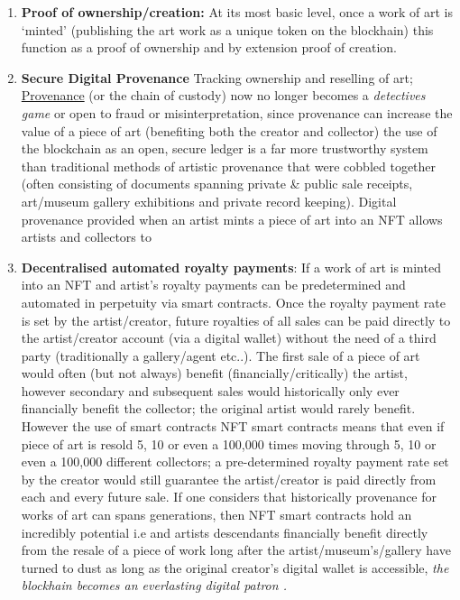 \begin{enumerate}
\def\labelenumi{\alph{enumi}.}
\item
  \textbf{Proof of ownership/creation:} At its most basic level, once a
  work of art is `minted' (publishing the art work as a unique token on
  the blockhain) this function as a proof of ownership and by extension
  proof of creation.
\item
  \textbf{Secure Digital Provenance} Tracking ownership and reselling of
  art; \href{https://en.wikipedia.org/wiki/Provenance}{Provenance} (or
  the chain of custody) now no longer becomes a \emph{detectives game}
  or open to fraud or misinterpretation, since provenance can increase
  the value of a piece of art (benefiting both the creator and
  collector) the use of the blockchain as an open, secure ledger is a
  far more trustworthy system than traditional methods of artistic
  provenance that were cobbled together (often consisting of documents
  spanning private \& public sale receipts, art/museum gallery
  exhibitions and private record keeping). Digital provenance provided
  when an artist mints a piece of art into an NFT allows artists and
  collectors to
\item
  \textbf{Decentralised automated royalty payments}: If a work of art is
  minted into an NFT and artist's royalty payments can be predetermined
  and automated in perpetuity via smart contracts. Once the royalty
  payment rate is set by the artist/creator, future royalties of all
  sales can be paid directly to the artist/creator account (via a
  digital wallet) without the need of a third party (traditionally a
  gallery/agent etc..). The first sale of a piece of art would often
  (but not always) benefit (financially/critically) the artist, however
  secondary and subsequent sales would historically only ever
  financially benefit the collector; the original artist would rarely
  benefit. However the use of smart contracts NFT smart contracts means
  that even if piece of art is resold 5, 10 or even a 100,000 times
  moving through 5, 10 or even a 100,000 different collectors; a
  pre-determined royalty payment rate set by the creator would still
  guarantee the artist/creator is paid directly from each and every
  future sale. If one considers that historically provenance for works
  of art can spans generations, then NFT smart contracts hold an
  incredibly potential i.e and artists descendants financially benefit
  directly from the resale of a piece of work long after the
  artist/museum's/gallery have turned to dust as long as the original
  creator's digital wallet is accessible, \emph{the blockhain becomes an
  everlasting digital patron .}
\end{enumerate}

